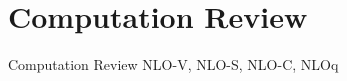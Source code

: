 \section{Computation Review}
\begin{frame}[<+->]{Computation Review}
NLO-V, NLO-S, NLO-C, NLOq
\end{frame}
